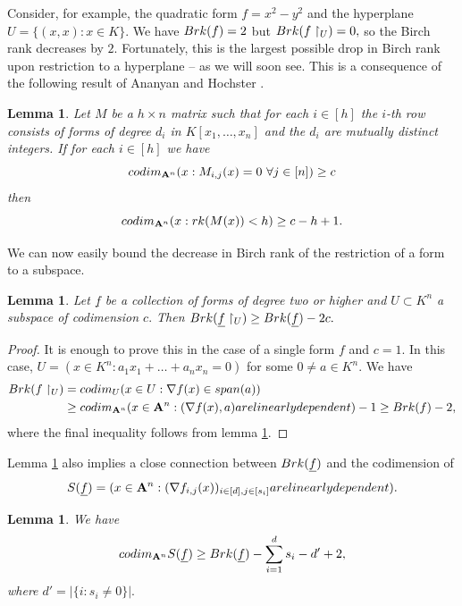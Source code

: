\documentclass[10pt,a4paper]{amsart}
\let\ul\underline
\newtheorem{lemma}[theorem]{Lemma}
\theoremstyle{definition}
\newcommand{\A}{\mathbf{A}}
\renewcommand{\sp}{\textnormal{span}}
\newcommand{\codim}{\textnormal{codim}}
\newcommand{\rk}{\textnormal{rk}}
\newcommand{\brk}{\textnormal{Brk}}
\begin{document}
Consider, for example, the quadratic form $f = x^2-y^2$ and the hyperplane $U  = \{(x,x):x\in K\}.$ We have $\brk(f) = 2$ but $\brk(f\restriction_U) = 0,$ so the Birch rank decreases by $2.$ Fortunately, this is the largest possible drop in Birch rank upon restriction to a hyperplane -- as we will soon see. This is a consequence of the following result of Ananyan and Hochster \cite[Theorem 2.4]{AH}.

\begin{lemma}\label{lem:mat-diff-deg}
    Let $M$ be a $h\times n$ matrix such that for each $i\in [h]$ the $i$-th row consists of forms of degree $d_i$ in $K[x_1,\ldots,x_n]$ and the $d_i$ are mutually distinct integers. If for each $i\in[h]$ we have
    \[
    \codim_{\A^n} (x:M_{i,j}(x) = 0\ \forall j\in [n]) \ge c
    \]
    then
    \[
    \codim_{\A^n} (x:\rk(M(x)) < h) \ge c-h+1.
    \] 
\end{lemma}

We can now easily bound the decrease in Birch rank of the restriction of a form to a subspace.

\begin{lemma}\label{lem:brk-subspace}
    Let $\ul{f}$ be a collection of forms of degree two or higher and $U\subset K^n$ a subspace of codimension $c.$
    Then $\brk(\ul{f}\restriction_U) \ge \brk(\ul{f}) -2c.$
\end{lemma}

\begin{proof}
    It is enough to prove this in the case of a single form $f$ and $c=1.$  In this case, $U = (x\in K^n: a_1x_1+\ldots+a_n x_n = 0)$ for some $0\neq a\in K^n.$ We have
    \begin{align*}
        \brk(f\restriction_U) &= \codim_U (x\in U: \nabla f(x)\in \sp(a)) \\
        &\ge \codim_{\A^n} (x\in \A^n: (\nabla f(x),a) \textnormal{ are linearly dependent}) - 1 \ge \brk(f) -2,
    \end{align*}
    where the final inequality follows from lemma \ref{lem:mat-diff-deg}.
\end{proof}

Lemma \ref{lem:mat-diff-deg} also implies a close connection between $\brk(\ul{f})$ and the codimension of 
$$S(\ul{f}) = (x\in \A^n: (\nabla f_{i,j}(x))_{i\in [d],j\in [s_i]} \textnormal{ are linearly dependent}).$$


\begin{lemma}\label{lem:brk-sing}
    We have 
    $$\codim_{\A^n} S(\ul{f}) \ge \brk(\ul{f}) -\sum_{i=1}^d s_i-d'+2,$$
    where $d' = |\{i:s_i\neq 0\}|.$
\end{lemma}
\end{document}
